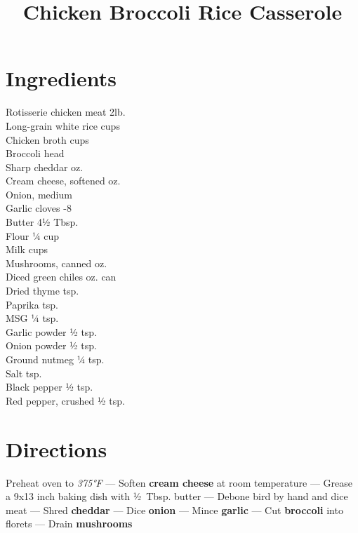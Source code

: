 \documentclass[11pt,letterpaper]{article}
\title{Chicken Broccoli Rice Casserole}
\author{}
\date{}
\begin{document}
\maketitle
\thispagestyle{empty}

\section*{Ingredients}
\setlength{\columnsep}{20pt}
\begin{multicols}{2}
\noindent
    Rotisserie chicken meat \dotfill 2lb. \\
    Long-grain white rice  cups \\
    Chicken broth  cups \\
    Broccoli  head \\
    Sharp cheddar  oz. \\
    Cream cheese, softened  oz. \\
    Onion, medium  \\
    Garlic cloves -8 \\
    Butter \dotfill 4½ Tbsp. \\
    Flour \dotfill ¼ cup \\
    Milk  cups \\
    \columnbreak
    Mushrooms, canned  oz. \\
    Diced green chiles  oz. can \\
    Dried thyme  tsp. \\
    Paprika  tsp. \\
    MSG \dotfill ¼ tsp. \\
    Garlic powder \dotfill ½ tsp. \\
    Onion powder \dotfill ½ tsp. \\
    Ground nutmeg \dotfill ¼ tsp. \\
    Salt  tsp. \\
    Black pepper \dotfill ½ tsp. \\
    Red pepper, crushed \dotfill ½ tsp.
\end{multicols}

\section*{Directions}

\noindent
Preheat oven to \textit{375°F} ---
Soften \textbf{cream cheese} at room temperature ---
Grease a 9x13 inch baking dish with ½~Tbsp. butter ---
Debone bird by hand and dice meat ---
Shred \textbf{cheddar} ---
Dice \textbf{onion} ---
Mince \textbf{garlic} ---
Cut \textbf{broccoli} into florets ---
Drain \textbf{mushrooms}
\end{document}
